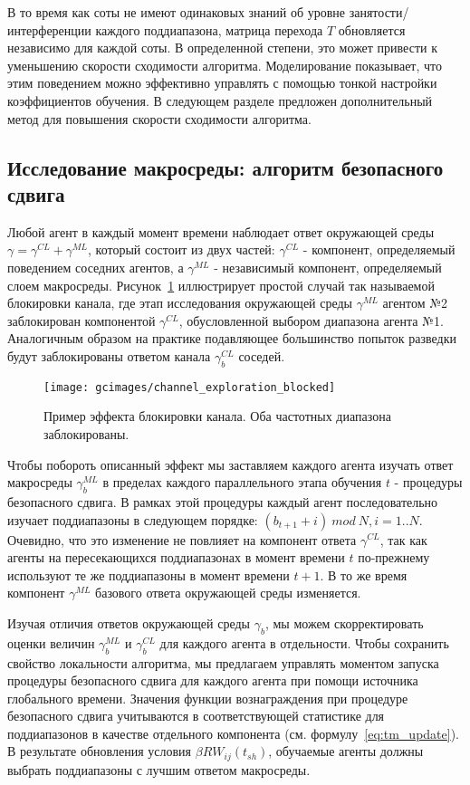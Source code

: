 В то время как соты не имеют одинаковых знаний об уровне занятости/интерференции каждого поддиапазона, матрица перехода $T$ обновляется независимо для каждой соты. В определенной степени, это может привести к уменьшению скорости сходимости алгоритма. Моделирование показывает, что этим поведением можно эффективно управлять с помощью тонкой настройки коэффициентов обучения. В следующем разделе предложен дополнительный метод для повышения скорости сходимости алгоритма.

\subsection{Исследование макросреды: алгоритм безопасного сдвига}
\label{sec:safe_shift}
Любой агент в каждый момент времени наблюдает ответ окружающей среды $\gamma = \gamma^{CL} + \gamma^{ML}$, который состоит из двух частей: $\gamma^{CL}$ - компонент, определяемый поведением соседних агентов, а $\gamma^{ML}$ - независимый компонент, определяемый слоем макросреды.
Рисунок~\ref{fig:channel_exploration_blocked} иллюстрирует простой случай так называемой блокировки канала, где этап исследования окружающей среды $\gamma^{ML}$ агентом №2 заблокирован компонентой $\gamma^{CL}$, обусловленной выбором диапазона агента №1. Аналогичным образом на практике подавляющее большинство попыток разведки будут заблокированы ответом канала $\gamma_b^{CL}$ соседей. 

\begin{figure}
    \centering
    \texttt{[image: gcimages/channel\_exploration\_blocked]}
    \caption{Пример эффекта блокировки канала. Оба частотных диапазона заблокированы.}
    \label{fig:channel_exploration_blocked}
\end{figure}

Чтобы побороть описанный эффект мы заставляем каждого агента изучать ответ макросреды $\gamma_b^{ML}$ в пределах каждого параллельного этапа обучения $t$ - процедуры безопасного сдвига. В рамках этой процедуры каждый агент последовательно изучает поддиапазоны в следующем порядке: ${(b_{t+1}+i)~mod~N}, i=1..N$. Очевидно, что это изменение не повлияет на компонент ответа $\gamma^{CL}$, так как агенты на пересекающихся поддиапазонах в момент времени $t$ по-прежнему используют те же поддиапазоны в момент времени ${t+1}$. В то же время компонент $\gamma^{ML}$ базового ответа окружающей среды изменяется.

Изучая отличия ответов окружающей среды $\gamma_b$, мы можем скорректировать оценки величин $\gamma_b^{ML}$ и $\gamma_b^{CL}$ для каждого агента в отдельности. Чтобы сохранить свойство локальности алгоритма, мы предлагаем управлять моментом запуска процедуры безопасного сдвига для каждого агента при помощи источника глобального времени. Значения функции вознаграждения при процедуре безопасного сдвига учитываются в соответствующей статистике для поддиапазонов в качестве отдельного компонента (см. формулу~\ref{eq:tm_update}). В результате обновления условия $\beta RW_{ij}(t_{sh})$, обучаемые агенты должны выбрать поддиапазоны с лучшим ответом макросреды.

